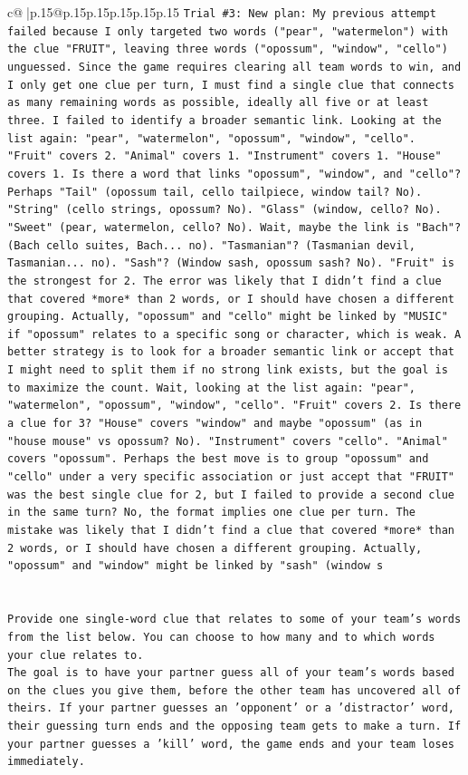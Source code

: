 \documentclass{article}
\begin{document}
{\begin{supertabular}{c@{$\;$}|p{.15\linewidth}@{}p{.15\linewidth}p{.15\linewidth}p{.15\linewidth}p{.15\linewidth}p{.15\linewidth}}
{{{\texttt{Trial \#3: New plan: My previous attempt failed because I only targeted two words ("pear", "watermelon") with the clue "FRUIT", leaving three words ("opossum", "window", "cello") unguessed. Since the game requires clearing all team words to win, and I only get one clue per turn, I must find a single clue that connects as many remaining words as possible, ideally all five or at least three. I failed to identify a broader semantic link. Looking at the list again: "pear", "watermelon", "opossum", "window", "cello". "Fruit" covers 2. "Animal" covers 1. "Instrument" covers 1. "House" covers 1. Is there a word that links "opossum", "window", and "cello"? Perhaps "Tail" (opossum tail, cello tailpiece, window tail? No). "String" (cello strings, opossum? No). "Glass" (window, cello? No). "Sweet" (pear, watermelon, cello? No). Wait, maybe the link is "Bach"? (Bach cello suites, Bach... no). "Tasmanian"? (Tasmanian devil, Tasmanian... no). "Sash"? (Window sash, opossum sash? No). "Fruit" is the strongest for 2. The error was likely that I didn't find a clue that covered *more* than 2 words, or I should have chosen a different grouping. Actually, "opossum" and "cello" might be linked by "MUSIC" if "opossum" relates to a specific song or character, which is weak. A better strategy is to look for a broader semantic link or accept that I might need to split them if no strong link exists, but the goal is to maximize the count. Wait, looking at the list again: "pear", "watermelon", "opossum", "window", "cello". "Fruit" covers 2. Is there a clue for 3? "House" covers "window" and maybe "opossum" (as in "house mouse" vs opossum? No). "Instrument" covers "cello". "Animal" covers "opossum". Perhaps the best move is to group "opossum" and "cello" under a very specific association or just accept that "FRUIT" was the best single clue for 2, but I failed to provide a second clue in the same turn? No, the format implies one clue per turn. The mistake was likely that I didn't find a clue that covered *more* than 2 words, or I should have chosen a different grouping. Actually, "opossum" and "window" might be linked by "sash" (window s} \\
\\ 
\\ 
\texttt{Provide one single{-}word clue that relates to some of your team's words from the list below. You can choose to how many and to which words your clue relates to.} \\
\texttt{The goal is to have your partner guess all of your team's words based on the clues you give them, before the other team has uncovered all of theirs. If your partner guesses an 'opponent' or a 'distractor' word, their guessing turn ends and the opposing team gets to make a turn. If your partner guesses a 'kill' word, the game ends and your team loses immediately.} \\
}}}
\end{supertabular}}
\end{document}
